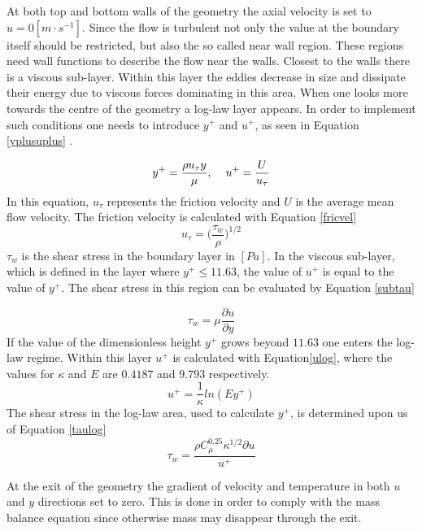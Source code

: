 \documentclass{CFD2017}
\begin{document}
At both top and bottom walls of the geometry the axial velocity is set to $u=0[m\cdot s^{-1}]$. Since the flow is turbulent not only the value at the boundary itself should be restricted, but also the so called near wall region. These regions need wall functions to describe the flow near the walls. Closest to the walls there is a viscous sub-layer. Within this layer the eddies decrease in size and dissipate their energy due to viscous forces dominating in this area. When one looks more towards the centre of the geometry a log-law layer appears. In order to implement such conditions one needs to introduce $y^+$ and $u^+$, as seen in Equation \ref{yplusuplus} \cite{Versteeg2007}.

\begin{equation}
\label{yplusuplus}
y^+=\frac{\rho u_{\tau}y}{\mu},\hspace{4mm}u^+=\frac{U}{ u_{\tau}}
\end{equation}
In this equation, $ u_{\tau}$ represents the friction velocity and $U$ is the average mean flow velocity. The friction velocity is calculated with Equation \ref{fricvel}
\begin{equation}
\label{fricvel}
u_{\tau}=\big(\frac{\tau_w}{\rho}\big)^{1/2}
\end{equation}
$\tau_w$ is the shear stress in the boundary layer in $[Pa]$. In the viscous sub-layer, which is defined in the layer where $y^+\leq 11.63$, the value of $u^+$ is equal to the value of $y^+$. The shear stress in this region can be evaluated by Equation \ref{subtau}

\begin{equation}
\label{subtau}
\tau_w = \mu \frac{\partial u}{\partial y}
\end{equation}
If the value of the dimensionless height $y^+$ grows beyond $11.63$ one enters the log-law regime. Within this layer $u^+$ is calculated with Equation\ref{ulog}, where the values for $\kappa$ and $E$ are $0.4187$ and $9.793$ respectively.
\begin{equation}
\label{ulog}
u^+=\frac{1}{\kappa}ln(Ey^+)
\end{equation}
The shear stress in the log-law area, used to calculate $y^+$, is determined upon us of Equation \ref{taulog}
\begin{equation}
\label{taulog}
\tau_w = \frac{\rho C_{\mu}^{0.25}\kappa^{1/2}\partial u}{u^+}
\end{equation}


 At the exit of the geometry the gradient of velocity and temperature in both $u$ and $y$ directions set to zero. This is done in order to comply with the mass balance equation since otherwise mass may disappear through the exit.\\
\end{document}
